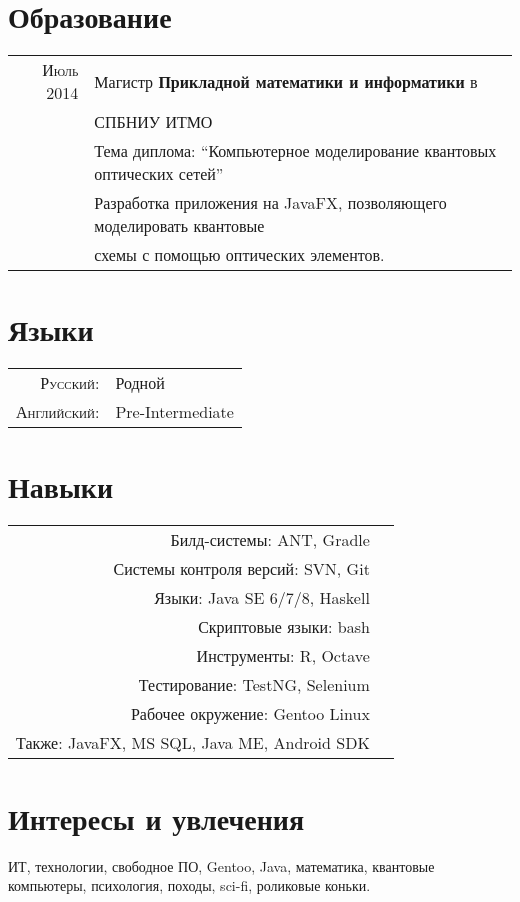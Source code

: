 \documentclass[a4paper,10pt]{article}
\begin{document}
\section{Образование}
	\begin{tabular}{rl}	
	  \textsc{Июль 2014} & Магистр \textbf{Прикладной математики и информатики} в \\& \textsc{СПБНИУ ИТМО}\\
			& Тема диплома: ``Компьютерное моделирование квантовых оптических сетей''\\&
			Разработка приложения на JavaFX, позволяющего моделировать квантовые\\& схемы с помощью оптических элементов.
	\end{tabular}

\section{Языки}
	\begin{tabular}{rl}
		\textsc{Русский:}&Родной\\
		\textsc{Английский:}&Pre-Intermediate\\
	\end{tabular}

\section{Навыки}
	\begin{tabular}{rl}
		Билд-системы: ANT, Gradle \\
		Системы контроля версий: SVN, Git \\
		Языки: Java SE 6/7/8, Haskell \\
		Скриптовые языки: bash \\ 
		Инструменты: R, Octave \\
		Тестирование: TestNG, Selenium \\
		Рабочее окружение: Gentoo Linux \\
		Также: JavaFX, MS SQL, Java ME, Android SDK
	\end{tabular}

\section{Интересы и увлечения}
	ИТ, технологии, свободное ПО, Gentoo, Java, математика, квантовые компьютеры,
	психология, походы, sci-fi, роликовые коньки. 
\end{document}
